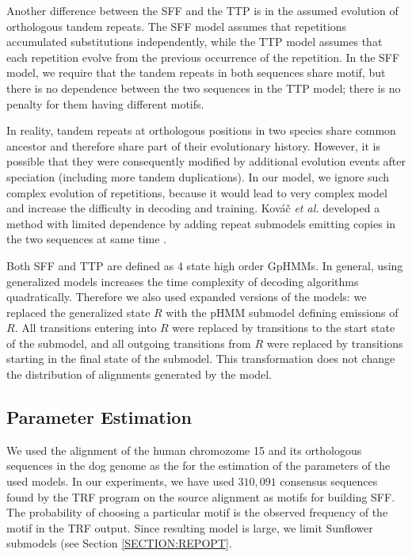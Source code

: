 Another difference between the SFF and the TTP is in the assumed evolution of
orthologous tandem repeats.  The SFF model assumes that repetitions accumulated
substitutions independently, while the TTP model assumes that each repetition
evolve from the previous occurrence of the repetition. In the SFF model, we
require that the tandem repeats in both sequences share motif, but there is no
dependence between the two sequences in the TTP model; there is no penalty for
them having different motifs.

In reality, tandem repeats at orthologous positions in two species share common
ancestor and therefore share part of their evolutionary history. However, it is
possible that they were consequently modified by additional evolution events
after speciation (including more tandem duplications). In our model, we ignore
such complex evolution of repetitions, because it would lead to very complex
model and increase the difficulty in decoding and training. Kováč {\it et al.}
developed a method with limited dependence by adding repeat submodels emitting
copies in the two sequences at same time \cite{Kovac2012}.

Both SFF and TTP are defined as $4$ state high order GpHMMs.  In general, using
generalized models increases the time complexity of decoding algorithms
quadratically. Therefore we also used expanded versions of the models: we
replaced the generalized state $R$ with the pHMM submodel defining emissions of
$R$. All transitions entering into $R$ were replaced by transitions to the
start state of the submodel, and all outgoing transitions from $R$ were
replaced by transitions starting in the final state of the submodel. This
transformation does not change the distribution of alignments generated by the
model.  

\subsection{Parameter Estimation}\label{SECTION:ALNPAREST}
We used the alignment of the human chromozome 15 and its orthologous sequences
in the dog genome as the  for the estimation of
the parameters of the used models.
In our experiments, we have used $310,091$ consensus sequences found by the TRF
program on the source alignment as motifs for building SFF.  The probability of choosing a particular
motif is the observed frequency of the motif in the TRF output. Since resulting
model is large, we limit Sunflower submodels (see Section \ref{SECTION:REPOPT}.

